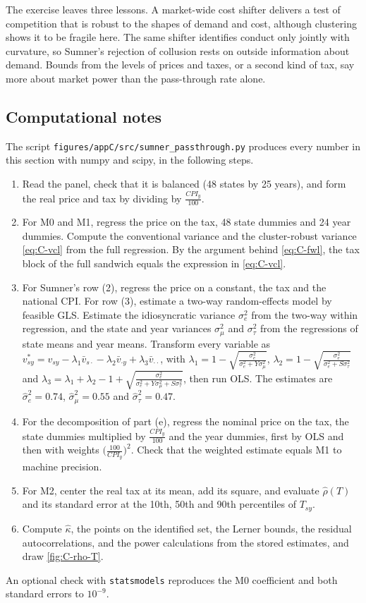 The exercise leaves three lessons. A market-wide cost shifter delivers a test of competition that is robust to the
shapes of demand and cost, although clustering shows it to be fragile here. The same shifter identifies conduct only
jointly with curvature, so Sumner's rejection of collusion rests on outside information about demand. Bounds from
the levels of prices and taxes, or a second kind of tax, say more about market power than the pass-through rate
alone.

\subsection{Computational notes}\label{sec:C-passthrough-computation}

The script \texttt{figures/appC/src/sumner\_passthrough.py} produces every number in this section with numpy and
scipy, in the following steps.
\begin{enumerate}
\item Read the panel, check that it is balanced (48 states by 25 years), and form the real price and tax by dividing by
  $\frac{CPI_y}{100}$.
\item For M0 and M1, regress the price on the tax, 48 state dummies and 24 year dummies. Compute the conventional
  variance and the cluster-robust variance \eqref{eq:C-vcl} from the full regression. By the argument behind
  \eqref{eq:C-fwl}, the tax block of the full sandwich equals the expression in \eqref{eq:C-vcl}.
\item For Sumner's row (2), regress the price on a constant, the tax and the national CPI. For row (3), estimate a
  two-way random-effects model by feasible GLS. Estimate the idiosyncratic variance $\sigma_e^2$ from the two-way
  within regression, and the state and year variances $\sigma_\mu^2$ and $\sigma_\tau^2$ from the regressions of state
  means and year means. Transform every variable as
  $v^*_{sy} = v_{sy} - \lambda_1\bar v_{s\cdot} - \lambda_2\bar v_{\cdot y} + \lambda_3\bar v_{\cdot\cdot}$, with
  $\lambda_1 = 1 - \sqrt{\frac{\sigma_e^2}{\sigma_e^2 + Y\sigma_\mu^2}}$,
  $\lambda_2 = 1 - \sqrt{\frac{\sigma_e^2}{\sigma_e^2 + S\sigma_\tau^2}}$ and
  $\lambda_3 = \lambda_1 + \lambda_2 - 1 + \sqrt{\frac{\sigma_e^2}{\sigma_e^2 + Y\sigma_\mu^2 + S\sigma_\tau^2}}$, then run
  OLS. The estimates are $\hat\sigma_e^2 = 0.74$, $\hat\sigma_\mu^2 = 0.55$ and $\hat\sigma_\tau^2 = 0.47$.
\item For the decomposition of part (e), regress the nominal price on the tax, the state dummies multiplied by
  $\frac{CPI_y}{100}$ and the year dummies, first by OLS and then with weights $\big(\frac{100}{CPI_y}\big)^2$. Check
  that the weighted estimate equals M1 to machine precision.
\item For M2, center the real tax at its mean, add its square, and evaluate $\hat\rho(T)$ and its standard error at
  the 10th, 50th and 90th percentiles of $T_{sy}$.
\item Compute $\hat\kappa$, the points on the identified set, the Lerner bounds, the residual autocorrelations, and
  the power calculations from the stored estimates, and draw \cref{fig:C-rho-T}.
\end{enumerate}
An optional check with \texttt{statsmodels} reproduces the M0 coefficient and both standard errors to $10^{-9}$.
